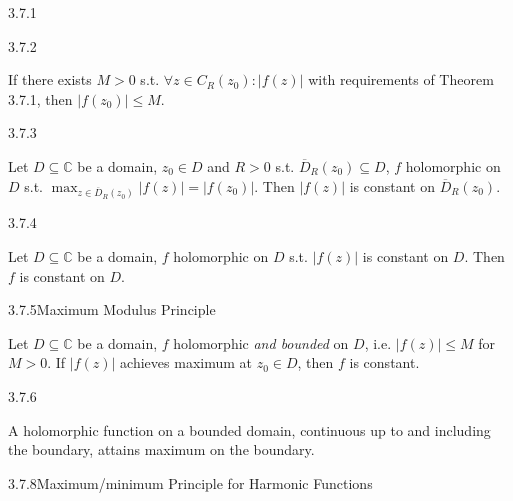 \documentclass[10pt,landscape]{article}
\renewcommand{\leq}{\leqslant}
\begin{document}
\begin{multicols}{3}
\begin{theorem}{3.7.1}{}
\end{theorem}

\begin{remark}{3.7.2}{}

    If there exists $M > 0$ s.t. $\forall z \in C_R(z_0): |f(z)|$ with requirements of Theorem 3.7.1, then $|f(z_0)| \leq M$.

\end{remark}

\begin{lemma}{3.7.3}{}

    Let $D \subseteq \mathbb{C}$ be a domain, $z_0 \in D$ and $R > 0$ s.t. $\overline{D}_R(z_0) \subseteq D$, $f$ holomorphic on $D$ s.t. $\max_{z \in \overline{D}_R(z_0)}{|f(z)|} = |f(z_0)|$. Then $|f(z)|$ is constant on $\overline{D}_R(z_0)$.

\end{lemma}

\begin{exercise}{3.7.4}{}

    Let $D \subseteq \mathbb{C}$ be a domain, $f$ holomorphic on $D$ s.t. $|f(z)|$ is constant on $D$. Then $f$ is constant on $D$.

\end{exercise}

\begin{theorem}{3.7.5}{Maximum Modulus Principle}

    Let $D \subseteq \mathbb{C}$ be a domain, $f$ holomorphic \emph{and bounded} on $D$, i.e. $|f(z)| \leq M$ for $M > 0$. If $|f(z)|$ achieves maximum at $z_0 \in D$, then $f$ is constant.

\end{theorem}

\begin{remark}{3.7.6}{}

    A holomorphic function on a bounded domain, continuous up to and including the boundary, attains maximum on the boundary.

\end{remark}

\begin{theorem}{3.7.8}{Maximum/minimum Principle for Harmonic Functions}


\end{theorem}
\end{multicols}
\end{document}
